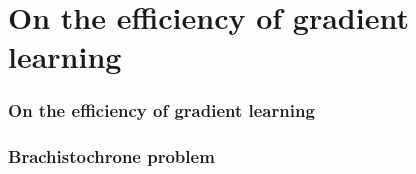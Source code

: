 \documentclass[aspectratio=169]{beamer}
\begin{document}
\section{On the efficiency of gradient learning}

\begin{frame}
\frametitle{On the efficiency of gradient learning}
\begin{figure}[ht]\centering
{}
\end{figure}
\end{frame}

\begin{frame}
\frametitle{Brachistochrone problem}
\begin{figure}[ht]\centering
{}
\end{figure}
\end{frame}
\end{document}
